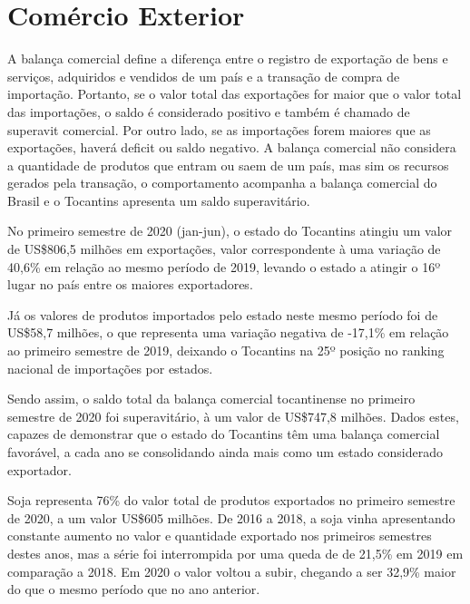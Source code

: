 \chapter{Comércio Exterior}

\par A balança comercial define a diferença entre o registro de exportação de bens e serviços, adquiridos e vendidos de um país e a transação de compra de importação. Portanto, se o valor total das exportações for maior que o valor total das importações, o saldo é considerado positivo e também é chamado de superavit comercial. Por outro lado, se as importações forem maiores que as exportações, haverá deficit ou saldo negativo. A balança comercial não considera a quantidade de produtos que entram ou saem de um país, mas sim os recursos gerados pela transação, o comportamento acompanha a balança comercial do Brasil e o Tocantins apresenta um saldo superavitário.


\par No primeiro semestre de 2020 (jan-jun), o estado do Tocantins atingiu um valor de US\$806,5 milhões em exportações, valor correspondente à uma variação de 40,6\% em relação ao mesmo período de 2019, levando o estado a atingir o 16º lugar no país entre os maiores exportadores.

\par Já os valores de produtos importados pelo estado neste mesmo período foi de US\$58,7 milhões, o que representa uma variação negativa de -17,1\% em relação ao primeiro semestre de 2019, deixando o Tocantins na 25º posição no ranking nacional de importações por estados.

\par Sendo assim, o saldo total da balança comercial tocantinense no primeiro semestre de 2020 foi superavitário, à um valor de US\$747,8 milhões. Dados estes, capazes de demonstrar que o estado do Tocantins têm uma balança comercial favorável, a cada ano se consolidando ainda mais como um estado considerado exportador.


\par Soja representa 76\% do valor total de produtos exportados no primeiro semestre de 2020, a um valor US\$605 milhões. De 2016 a 2018, a soja vinha apresentando constante aumento no valor e quantidade exportado nos primeiros semestres destes anos, mas a série foi interrompida por uma queda de de 21,5\% em 2019 em comparação a 2018. Em 2020 o valor voltou a subir, chegando a ser 32,9\% maior do que o mesmo período que no ano anterior.

